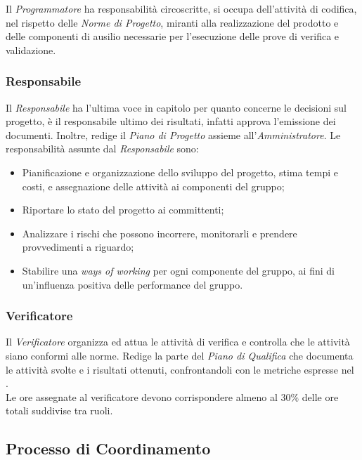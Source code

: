 	Il \textit{Programmatore} ha responsabilità circoscritte, si occupa dell'attività di codifica, nel rispetto delle \textit{Norme di Progetto}, miranti alla realizzazione del prodotto e delle componenti di ausilio necessarie per l'esecuzione delle prove di verifica e validazione.


	\subsubsection{Responsabile}
	
	Il \textit{Responsabile} ha l'ultima voce in capitolo per quanto concerne le decisioni sul progetto, è il responsabile ultimo dei risultati, infatti approva l'emissione dei documenti. Inoltre, redige il \textit{Piano di Progetto} assieme all'\textit{Amministratore}. 
	Le responsabilità assunte dal \textit{Responsabile} sono:

	\begin{itemize}

		\item Pianificazione e organizzazione dello sviluppo del progetto, stima tempi e costi, e assegnazione delle attività ai componenti del gruppo;
		\item Riportare lo stato del progetto ai committenti;
		\item Analizzare i rischi che possono incorrere, monitorarli e prendere provvedimenti a riguardo;
		\item Stabilire una \textit{ways of working} per ogni componente del gruppo, ai fini di un'influenza positiva delle performance del gruppo.
	
	\end{itemize}

	
	\subsubsection{Verificatore}

	Il \textit{Verificatore} organizza ed attua le attività di verifica e controlla che le attività siano conformi alle norme. Redige la parte del \textit{Piano di Qualifica} che documenta le attività svolte e i risultati ottenuti, confrontandoli con le metriche espresse nel \PianoDiQualifica. \\ 
	Le ore assegnate al verificatore devono corrispondere almeno al 30$\%$ delle ore totali suddivise tra ruoli.
	
	\subsection{Processo di Coordinamento}


